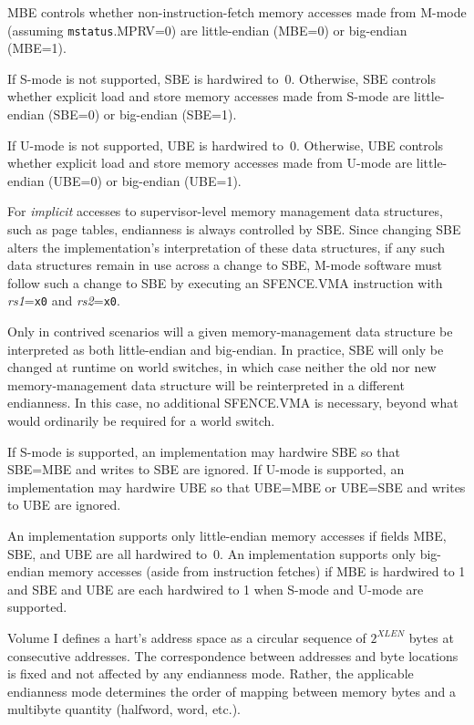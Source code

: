 MBE controls whether non-instruction-fetch memory accesses made from
M-mode (assuming {\tt mstatus}.MPRV=0) are little-endian (MBE=0) or
big-endian (MBE=1).

If S-mode is not supported, SBE is hardwired to~0.
Otherwise, SBE controls whether explicit load and store memory accesses made
from S-mode are little-endian (SBE=0) or big-endian (SBE=1).

If U-mode is not supported, UBE is hardwired to~0.
Otherwise, UBE controls whether explicit load and store memory accesses made
from U-mode are little-endian (UBE=0) or big-endian (UBE=1).

For {\em implicit} accesses to supervisor-level memory management data
structures, such as page tables, endianness is always controlled by SBE.
Since changing SBE alters the implementation's interpretation of these data
structures, if any such data structures remain in use across a change to SBE,
M-mode software must follow such a change to SBE by executing an
SFENCE.VMA instruction with {\em rs1}={\tt x0} and {\em rs2}={\tt x0}.

\begin{commentary}
Only in contrived scenarios will a given memory-management data structure be
interpreted as both little-endian and big-endian.
In practice, SBE will only be changed at runtime on world switches, in which
case neither the old nor new memory-management data structure will be
reinterpreted in a different endianness.
In this case, no additional SFENCE.VMA is necessary, beyond what would
ordinarily be required for a world switch.
\end{commentary}

If S-mode is supported, an implementation may hardwire SBE so that
SBE=MBE and writes to SBE are ignored.
If U-mode is supported, an implementation may hardwire UBE so that
UBE=MBE or UBE=SBE and writes to UBE are ignored.

\begin{commentary}
An implementation supports only little-endian memory accesses if fields
MBE, SBE, and UBE are all hardwired to~0.
An implementation supports only big-endian memory accesses (aside from
instruction fetches) if MBE is hardwired to 1 and SBE and UBE are each
hardwired to 1 when S-mode and U-mode are supported.
\end{commentary}

\begin{commentary}
Volume I defines a hart's address space as a circular sequence of
$2^{XLEN}$ bytes at consecutive addresses.
The correspondence between addresses and byte locations is fixed and not
affected by any endianness mode.
Rather, the applicable endianness mode determines the order of mapping
between memory bytes and a multibyte quantity (halfword, word, etc.).
\end{commentary}

